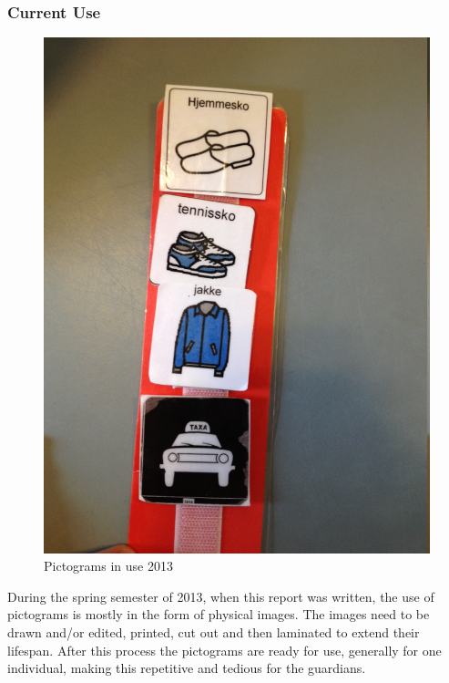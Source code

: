 \subsubsection*{Current Use}
\label{subsub:pic_currentuse}
\begin{figure}[!ht]
        \centering
        \includegraphics[scale=0.15]{tex/commonReport/img/current_use_picto.jpg}
        \caption{\label{img:pic_current} Pictograms in use 2013}
\end{figure}
During the spring semester of 2013, when this report was written, the use of pictograms is mostly in the form of physical images. The images need to be drawn and/or edited, printed, cut out and then laminated to extend their lifespan. After this process the pictograms are ready for use, generally for one individual, making this repetitive and tedious for the guardians.%

